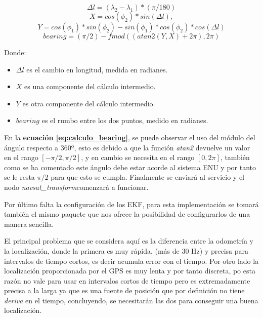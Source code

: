 \begin{equation}\label{eq:delta_longitud}
\Delta{l} =( \lambda_{2} - \lambda_{1} ) * (\pi/180) 
\end{equation}
\begin{equation}\label{eq:calculo_x}
X = cos(\phi_{2}) * sin(\Delta{l}), 
\end{equation}
\begin{equation}\label{eq:calculo_y}
Y = cos(\phi_{1}) * sin(\phi_{2}) - sin(\phi_{1}) * cos(\phi_{2}) * cos(\Delta{l})
\end{equation}
\begin{equation}\label{eq:calculo_bearing}
bearing = (\pi/2) - fmod((atan2(Y,X) + 2\pi),2\pi)
\end{equation}

Donde:
\begin{itemize}
    \item \(\Delta{l}\) es el cambio en longitud, medida en radianes.
    \item \(X\) es una componente del cálculo intermedio.
    \item \(Y\) es otra componente del cálculo intermedio.
    \item \({bearing}\) es el rumbo entre los dos puntos, medido en radianes.
\end{itemize}

En la \textbf{ecuación \ref{eq:calculo_bearing}}, se puede observar el uso del módulo del ángulo respecto a 360º, esto es debido 
a que la función \textit{atan2} devuelve un valor en el rango $[ -\pi/2,\pi/2 ]$, y en cambio se necesita en
el rango $[0, 2\pi]$, también como se ha comentado este ángulo debe estar acorde al sistema ENU y por tanto se le resta $\pi/2$ para que esto se cumpla. Finalmente 
se enviará al servicio y el nodo  \textit{navsat\_transform}comenzará a funcionar.

Por último falta la configuración de los EKF, para esta implementación se tomará también el mismo paquete que nos ofrece la posibilidad de 
configurarlos de una manera sencilla.

El principal problema que se considera aquí es la diferencia entre la odometría y la localización, donde la primera es muy rápida, 
(más de 30 Hz) y precisa para intervalos de tiempo cortos, es decir acumula error con el tiempo. Por otro
lado la localización proporcionada por el GPS es muy lenta y por tanto discreta, po esta razón no vale para usar en 
intervalos cortos de tiempo pero es extremadamente precisa a la larga ya que es una fuente de posición que por definición no tiene
\textit{deriva} en el tiempo, concluyendo, se necesitarán las dos para conseguir una buena localización.


